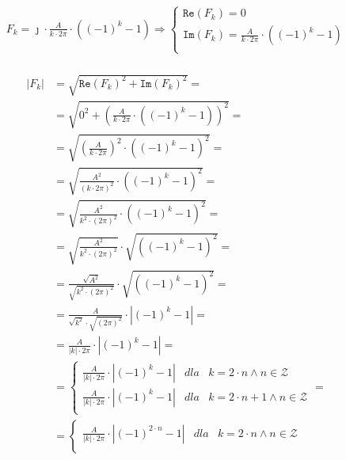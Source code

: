 \begin{task}
\begin{align*}
F_k = \jmath \cdot \frac{A}{k\cdot 2 \pi}\cdot \left( (-1)^{k} -1 \right) \Rightarrow \left\{\begin{array}{l}
\mathtt{Re}\left(F_k\right) = 0\\
\mathtt{Im}\left(F_k\right) = \frac{A}{k\cdot 2 \pi}\cdot \left( (-1)^{k} -1 \right)\\
\end{array}\right.\\
\end{align*}


\begin{align*}
\left|F_k\right| &= \sqrt{\mathtt{Re}\left(F_k\right)^2+\mathtt{Im}\left(F_k\right)^2}=\\
&=\sqrt{0^2+\left(\frac{A}{k\cdot 2 \pi}\cdot \left( (-1)^{k} -1 \right)\right)^2}=\\
&=\sqrt{\left(\frac{A}{k\cdot 2 \pi}\right)^2 \cdot \left( (-1)^{k} -1 \right)^2}=\\
&=\sqrt{\frac{A^2}{\left(k\cdot 2 \pi\right)^2} \cdot \left( (-1)^{k} -1 \right)^2}=\\
&=\sqrt{\frac{A^2}{k^2\cdot \left(2 \pi\right)^2} \cdot \left( (-1)^{k} -1 \right)^2}=\\
&=\sqrt{\frac{A^2}{k^2\cdot \left(2 \pi\right)^2}} \cdot \sqrt{\left( (-1)^{k} -1 \right)^2}=\\
&=\frac{\sqrt{A^2}}{\sqrt{k^2\cdot \left(2 \pi\right)^2}} \cdot \sqrt{\left( (-1)^{k} -1 \right)^2}=\\
&=\frac{A}{\sqrt{k^2}\cdot \sqrt{\left(2 \pi\right)^2}} \cdot \left|(-1)^{k} -1 \right|=\\
&=\frac{A}{\left|k\right|\cdot 2 \pi} \cdot \left|(-1)^{k} -1 \right|=\\
&=\left\{\begin{array}{lll}
\frac{A}{\left|k\right|\cdot 2 \pi} \cdot \left|(-1)^{k} -1 \right| & dla & k = 2 \cdot n \wedge n \in \mathcal{Z}\\
\frac{A}{\left|k\right|\cdot 2 \pi} \cdot \left|(-1)^{k} -1 \right| & dla & k = 2 \cdot n + 1 \wedge n \in \mathcal{Z}\\
\end{array}\right. = \\
&=\left\{\begin{array}{lll}
\frac{A}{\left|k\right|\cdot 2 \pi} \cdot \left|(-1)^{2\cdot n} -1 \right| & dla &k = 2 \cdot n \wedge n \in \mathcal{Z}\\

\end{array}
\end{align*}
\end{task}
